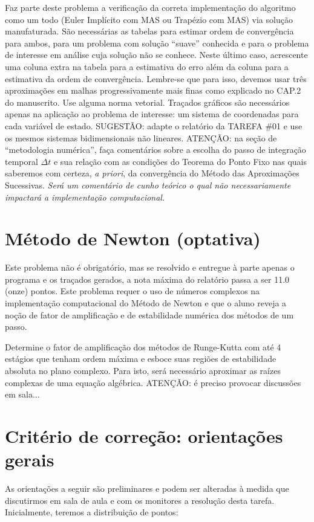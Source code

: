 \documentclass{article}
\begin{document}
Faz parte deste problema a verificação da correta implementação do algoritmo como um todo (Euler Implícito com MAS ou Trapézio com MAS) via solução manufaturada. São  necessárias as tabelas para estimar ordem de convergência para ambos, para um problema com solução ``suave'' conhecida e para o problema de interesse em análise cuja solução não se conhece. Neste último caso, acrescente uma coluna extra na tabela para a estimativa do erro além da coluna para a estimativa da ordem de convergência. Lembre-se que para isso, devemos usar três aproximações em malhas progressivamente mais finas como explicado no CAP.2 do manuscrito. Use alguma norma vetorial.  Traçados gráficos são necessários apenas na aplicação ao problema de interesse: um sistema de coordenadas para cada variável de estado. SUGESTÃO: adapte o relatório da TAREFA \#01 e use os mesmos sistemas bidimensionais não li\-neares. ATENÇÃO: na seção de ``metodologia numérica'', faça comentários sobre a escolha do passo de integração temporal $\Delta t$ e sua relação com as condições do Teorema do Ponto Fixo nas quais saberemos com certeza, {\it a priori}, da convergência do Método das Aproximações Sucessivas. {\it Será um comentário de cunho teórico o qual não necessariamente impactará a implementação computacional}.

\section{Método de Newton (optativa)}
Este problema não é obrigatório, mas se resolvido e entregue à parte apenas o programa e os traçados gerados, a nota máxima do relatório passa a ser 11.0 (onze) pontos. Este problema requer o uso de números complexos na implementação computacional do Método de Newton e que o aluno reveja a noção de fator de amplificação e de estabilidade numérica dos métodos de um passo. 


Determine o fator de amplificação dos métodos de Runge-Kutta com até 4 estágios que tenham ordem máxima e esboce suas regiões de estabilidade absoluta no plano complexo. Para isto, será necessário aproximar as  raízes complexas de uma equação algébrica. ATENÇÃO: é preciso provocar discussões em sala... 


\section{Critério de correção: orientações gerais}
As orientações a seguir são preliminares e podem ser alteradas à medida que discutirmos em sala de aula e com os monitores a resolução desta tarefa. Inicialmente, teremos a distribuição de pontos:
\end{document}
